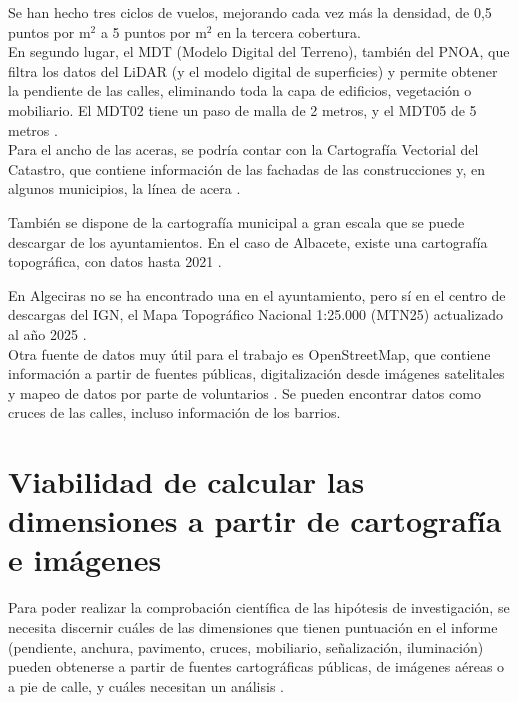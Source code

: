 Se han hecho tres ciclos de vuelos, mejorando cada vez más la densidad, de 0,5 puntos por m$^2$ a 5 puntos por m$^2$ en la tercera cobertura.
\\

En segundo lugar, el MDT (Modelo Digital del Terreno), también del PNOA, que filtra los datos del LiDAR (y el modelo digital de superficies) y permite obtener la pendiente de las calles, eliminando toda la capa de edificios, vegetación o mobiliario. El MDT02 tiene un paso de malla de 2 metros, y el MDT05 de 5 metros \parencite{pnoa_mdt}.
\\

Para el ancho de las aceras, se podría contar con la Cartografía Vectorial del Catastro, que contiene información de las fachadas de las construcciones y, en algunos municipios, la línea de acera \parencite{catastro_descarga_datos}.

También se dispone de la cartografía municipal a gran escala que se puede descargar de los ayuntamientos. En el caso de Albacete, existe una cartografía topográfica, con datos hasta 2021 \parencite{cartografia_topografica_albacete}.

En Algeciras no se ha encontrado una en el ayuntamiento, pero sí en el centro de descargas del IGN, el Mapa Topográfico Nacional 1:25.000 (MTN25) actualizado al año 2025 \parencite{mtn25_cnig}.
\\

Otra fuente de datos muy útil para el trabajo es OpenStreetMap, que contiene información a partir de fuentes públicas, digitalización desde imágenes satelitales y mapeo de datos por parte de voluntarios \parencite{openstreetmap}. Se pueden encontrar datos como cruces de las calles, incluso información de los barrios.

\section{Viabilidad de calcular las dimensiones a partir de cartografía e imágenes}
\label{sec:viabilidad}

Para poder realizar la comprobación científica de las hipótesis de investigación, se necesita discernir cuáles de las dimensiones que tienen puntuación en el informe (pendiente, anchura, pavimento, cruces, mobiliario, señalización, iluminación) pueden obtenerse a partir de fuentes cartográficas públicas, de imágenes aéreas o a pie de calle, y cuáles necesitan un análisis .
\\

